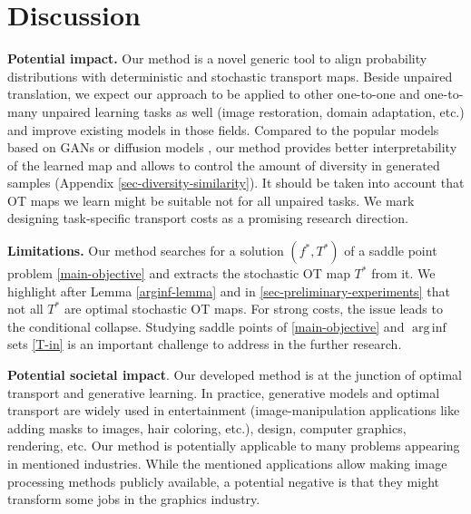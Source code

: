 \documentclass{article} %
\DeclareMathOperator*{\arginf}{arg\,inf}
\begin{document}
\vspace{-2.5mm}
\section{Discussion}
\label{sec-dicsussion}

\vspace{-2mm}\textbf{Potential impact.} Our method is a novel generic tool to align probability distributions with deterministic and stochastic transport maps. Beside unpaired translation, we expect our approach to be applied to other one-to-one and one-to-many unpaired learning tasks as well (image restoration, domain adaptation, etc.) and improve existing models in those fields. Compared to the popular models based on GANs \citep{goodfellow2014generative} or diffusion models \citep{ho2020denoising}, our method provides better interpretability of the learned map and allows to control the amount of diversity in generated samples (Appendix \ref{sec-diversity-similarity}). It should be taken into account that OT maps we learn might be suitable not for all unpaired tasks. We mark designing task-specific transport costs as a promising research direction.


\vspace{-1mm}\textbf{Limitations.} Our method searches for a solution $(f^{*},T^{*})$ of a saddle point problem \eqref{main-objective} and extracts the stochastic OT map $T^{*}$ from it. We highlight after Lemma \ref{arginf-lemma} and in \wasyparagraph\ref{sec-preliminary-experiments} that not all $T^{*}$ are optimal stochastic OT maps. For strong costs, the issue leads to the conditional collapse. Studying saddle points of \eqref{main-objective} and $\arginf$ sets \eqref{T-in} is an important challenge to address in the further research.

\textbf{Potential societal impact}. Our developed method is at the junction of optimal transport and generative learning. In practice, generative models and optimal transport are widely used in entertainment (image-manipulation applications like adding masks to images, hair coloring, etc.), design, computer graphics, rendering, etc. Our method is potentially applicable to many problems appearing in mentioned industries. While the mentioned applications allow making image processing methods publicly available, a potential negative is that they might transform some jobs in the graphics industry.
\end{document}
